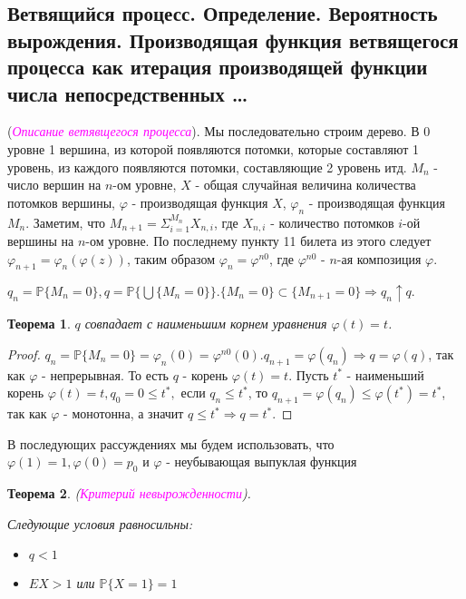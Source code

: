 \documentclass[a4paper,100pt]{article}
\theoremstyle{indented}
\newtheorem{theorem}{Теорема}
\theoremstyle{definition}
\theoremstyle{remark}
\begin{document}
\subsection{Ветвящийся процесс. Определение. Вероятность вырождения. Производящая функция ветвящегося процесса как итерация производящей функции числа непосредственных \ldots} 

(\hypertarget{n27}{\textcolor{magenta}{\textit{Описание ветявщегося процесса}}}). Мы последовательно строим дерево. В 0 уровне 1 вершина, из которой появляются потомки, которые составляют 1 уровень, из каждого появляются потомки, составляющие 2 уровень итд. $M_n$ - число вершин на $n$-ом уровне, $X$ - общая случайная величина количества потомков вершины, $\varphi$ - производящая функция $X$, $\varphi_n$ - производящая функция $M_n$. Заметим, что $M_{n+1} = \Sigma_{i=1}^{M_n}X_{n,i}$, где $X_{n,i}$ - количество потомков $i$-ой вершины на $n$-ом уровне. По последнему пункту 11 билета из этого следует $\varphi_{n+1}=\varphi_n(\varphi(z))$, таким образом $\varphi_n=\varphi^{n0}$, где $\varphi^{n0}$ - $n$-ая композиция $\varphi$. 

$q_n=\mathbb P \{M_n=0\}, q = \mathbb P \{\bigcup\{M_n=0\}\}. \{M_n=0\} \subset \{M_{n+1}=0\} \Rightarrow q_n \uparrow q.$ \\
    
\begin{theorem}
  $q$ совпадает с наименьшим корнем уравнения $\varphi(t) = t$.
\end{theorem}

\begin{proof}
  $q_n=\mathbb P \{M_n=0\} = \varphi_n(0) = \varphi^{n0}(0). q_{n+1} = \varphi(q_n) \Rightarrow q = \varphi(q)$, так как $\varphi$ -  непрерывная. То есть $q$ - корень $\varphi(t)=t$. Пусть $t^{*}$ - наименьший корень $\varphi(t) = t, q_0 = 0 \leq t^{*},$ если $q_n \leq t^{*}$, то $q_{n+1} = \varphi(q_n) \leq \varphi(t^{*}) = t^{*}$, так как $\varphi$ - монотонна, а значит $q \leq t^{*} \Rightarrow q = t^{*}$.
\end{proof}

В последующих рассуждениях мы будем использовать, что $\varphi(1)=1,\varphi(0)=p_0$ и $\varphi$ - неубывающая выпуклая функция \\ 
    
\begin{theorem}
  (\hypertarget{n28}{\textcolor{magenta}{\textit{Критерий невырожденности}}}).
    
    Следующие условия равносильны:
    \begin{itemize}
        \item $q < 1$ 
        \item $EX > 1$ или $\mathbb P \{X = 1\} = 1$
    \end{itemize}
  \end{theorem}
\end{document}

